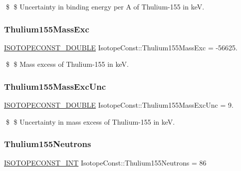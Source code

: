 \$ \$ Uncertainty in binding energy per A of Thulium-\/155 in keV. \mbox{\label{group___isotope_const-_thulium-_tm155_ga2e4ec52afc269a924f32245a04fc5eed}} 
\subsubsection{\texorpdfstring{Thulium155\+Mass\+Exc}{Thulium155MassExc}}
{\footnotesize\ttfamily \mbox{\hyperlink{group___isotope_const-_macros_ga8f45a7272ce02c0b4c65c44636ed719a}{I\+S\+O\+T\+O\+P\+E\+C\+O\+N\+S\+T\+\_\+\+D\+O\+U\+B\+LE}} Isotope\+Const\+::\+Thulium155\+Mass\+Exc = -\/56625.}

\$ \$ Mass excess of Thulium-\/155 in keV. \mbox{\label{group___isotope_const-_thulium-_tm155_ga7e2741ada22c26925047b5c8fb8404f6}} 
\subsubsection{\texorpdfstring{Thulium155\+Mass\+Exc\+Unc}{Thulium155MassExcUnc}}
{\footnotesize\ttfamily \mbox{\hyperlink{group___isotope_const-_macros_ga8f45a7272ce02c0b4c65c44636ed719a}{I\+S\+O\+T\+O\+P\+E\+C\+O\+N\+S\+T\+\_\+\+D\+O\+U\+B\+LE}} Isotope\+Const\+::\+Thulium155\+Mass\+Exc\+Unc = 9.}

\$ \$ Uncertainty in mass excess of Thulium-\/155 in keV. \mbox{\label{group___isotope_const-_thulium-_tm155_ga4f6553178326f322d60cb1f7bd0925b3}} 
\subsubsection{\texorpdfstring{Thulium155\+Neutrons}{Thulium155Neutrons}}
{\footnotesize\ttfamily \mbox{\hyperlink{group___isotope_const-_macros_ga5f18360b3e99483a35c32d789e62621c}{I\+S\+O\+T\+O\+P\+E\+C\+O\+N\+S\+T\+\_\+\+I\+NT}} Isotope\+Const\+::\+Thulium155\+Neutrons = 86}

